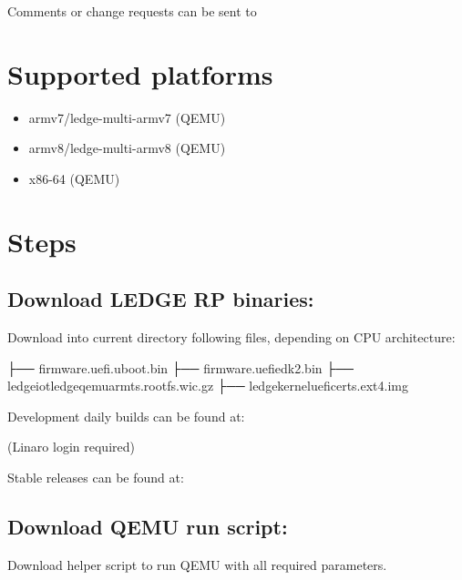 \documentclass[a4paper,10pt,oneside,english]{sphinxmanual}
\begin{document}
Comments or change requests can be sent to 


\section{Supported platforms}
\label{\detokenize{user-guide:supported-platforms}}\begin{itemize}
\item {} 
armv7/ledge-multi-armv7 (QEMU)

\item {} 
armv8/ledge-multi-armv8 (QEMU)

\item {} 
x86-64 (QEMU)

\end{itemize}


\section{Steps}
\label{\detokenize{user-guide:steps}}

\subsection{Download LEDGE RP binaries:}
\label{\detokenize{user-guide:download-ledge-rp-binaries}}
Download into current directory following files, depending on CPU architecture:

\begin{sphinxVerbatim}[commandchars=\\\{\}]
├── firmware.uefi.uboot.bin
├── firmware.uefi\PYGZhy{}edk2.bin
├── ledge\PYGZhy{}iot\PYGZhy{}ledge\PYGZhy{}qemuarm\PYGZhy{}\PYGZlt{}ts\PYGZgt{}.rootfs.wic.gz
├── ledge\PYGZhy{}kernel\PYGZhy{}uefi\PYGZhy{}certs.ext4.img
\end{sphinxVerbatim}

\begin{DUlineblock}{0em}
\item[] Development daily builds can be found at:
\item[] 
\item[] (Linaro login required)
\item[] Stable releases can be found at:
\item[] 
\end{DUlineblock}


\subsection{Download QEMU run script:}
\label{\detokenize{user-guide:download-qemu-run-script}}
Download helper script to run QEMU with all required parameters.
\end{document}
